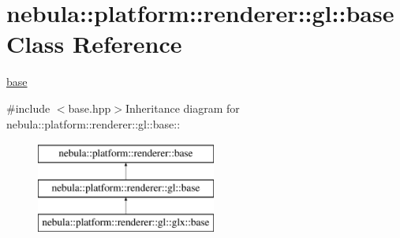 \hypertarget{classnebula_1_1platform_1_1renderer_1_1gl_1_1base}{
\section{nebula::platform::renderer::gl::base Class Reference}
\label{classnebula_1_1platform_1_1renderer_1_1gl_1_1base}
}


\hyperlink{classnebula_1_1platform_1_1renderer_1_1gl_1_1base}{base}  


{\ttfamily \#include $<$base.hpp$>$}Inheritance diagram for nebula::platform::renderer::gl::base::\begin{figure}[H]
\begin{center}
\leavevmode
\includegraphics[height=3cm]{classnebula_1_1platform_1_1renderer_1_1gl_1_1base}
\end{center}
\end{figure}
